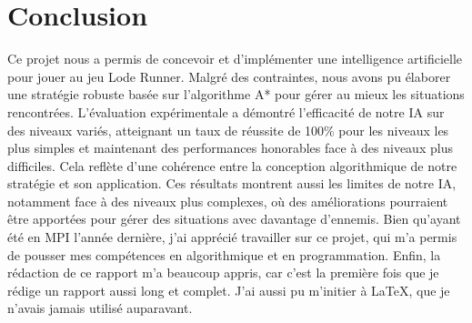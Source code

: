 \chapter{Conclusion}
\label{cp:conclusion}

Ce projet nous a permis de concevoir et d'implémenter une intelligence artificielle pour jouer au jeu Lode Runner.
Malgré des contraintes, nous avons pu élaborer une stratégie robuste basée sur l'algorithme A* pour gérer au mieux les situations rencontrées.
\newline
L'évaluation expérimentale a démontré l'efficacité de notre IA sur des niveaux variés, atteignant un taux de réussite de 100\% pour les niveaux les plus simples et maintenant des performances honorables face à des niveaux plus difficiles.
Cela reflète d'une cohérence entre la conception algorithmique de notre stratégie et son application.
\newline
Ces résultats montrent aussi les limites de notre IA, notamment face à des niveaux plus complexes, où des améliorations pourraient être apportées pour gérer des situations avec davantage d'ennemis.
\newline\newline
Bien qu'ayant été en MPI l'année dernière, j'ai apprécié travailler sur ce projet, qui m'a permis de pousser mes compétences en algorithmique et en programmation.
\newline
Enfin, la rédaction de ce rapport m'a beaucoup appris, car c'est la première fois que je rédige un rapport aussi long et complet.
J'ai aussi pu m'initier à \LaTeX, que je n'avais jamais utilisé auparavant.